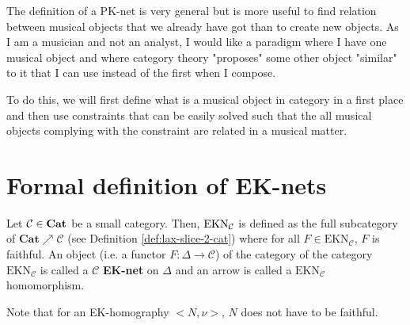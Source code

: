 
The definition of a PK-net is very general but is more useful to find relation between musical objects that we already have got than to create new objects. As I am a musician and not an analyst, I would like a paradigm where I have one musical object and where category theory "proposes" some other object "similar" to it that I can use instead of the first when I compose.

To do this, we will first define what is a musical object in category in a first place and then use constraints that can be easily solved such that the all musical objects complying with the constraint are related in a musical matter.




\section{Formal definition of EK-nets}


\begin{defn}
    Let $\mathcal{C}\in \bf Cat$ be a small category. %
     Then, $\bf \text{EKN}_\mathcal{C}$ \label{nomencl:EKN} is defined as the full subcategory of $\textbf{Cat}\nearrow \mathcal{C}$ (see Definition \ref{def:lax-slice-2-cat}) where for all $F\in \text{EKN}_\mathcal{C}$, $F$ is faithful. An object (i.e. a functor $F : \Delta \rightarrow \mathcal{C}$) of the category of the category $\text{EKN}_\mathcal{C}$ is called a $\mathcal{C}$ \textbf{EK-net} on  $\Delta$ and an arrow is called a $\text{EKN}_\mathcal{C}$ homomorphism.
\end{defn}

\begin{rem}
    Note that for an EK-homography $\big<N,\nu\big>$, $N$ does not have to be faithful.
\end{rem}


